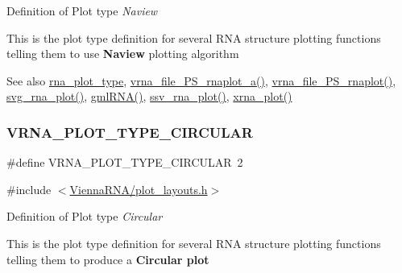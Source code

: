 Definition of Plot type {\itshape Naview} 

This is the plot type definition for several R\+NA structure plotting functions telling them to use {\bfseries Naview} plotting algorithm

\begin{DoxySeeAlso}{See also}
\hyperlink{group__plotting__utils_ga5964c4581431b098b80027d6e14dcdd4}{rna\+\_\+plot\+\_\+type}, \hyperlink{plot__structure_8h_a139a31dd0ba9fc6612431f67de901c31}{vrna\+\_\+file\+\_\+\+P\+S\+\_\+rnaplot\+\_\+a()}, \hyperlink{plot__structure_8h_abdc8f6548ba4a3bc3cd868ccbcfdb86a}{vrna\+\_\+file\+\_\+\+P\+S\+\_\+rnaplot()}, \hyperlink{plot__structure_8h_ae7853539b5df98f294b4af434e979304}{svg\+\_\+rna\+\_\+plot()}, \hyperlink{plot__structure_8h_a70834bc8c0aad4fe6824ff76ccb8f329}{gml\+R\+N\+A()}, \hyperlink{plot__structure_8h_add368528755f9a830727b680243541df}{ssv\+\_\+rna\+\_\+plot()}, \hyperlink{plot__structure_8h_a2f6d5953e6a323df898896b8d6614483}{xrna\+\_\+plot()} 
\end{DoxySeeAlso}
\mbox{\label{group__plotting__utils_ga8c9eac631348da92136c8363ecdd9fb9}} 
\subsubsection{\texorpdfstring{V\+R\+N\+A\+\_\+\+P\+L\+O\+T\+\_\+\+T\+Y\+P\+E\+\_\+\+C\+I\+R\+C\+U\+L\+AR}{VRNA\_PLOT\_TYPE\_CIRCULAR}}
{\footnotesize\ttfamily \#define V\+R\+N\+A\+\_\+\+P\+L\+O\+T\+\_\+\+T\+Y\+P\+E\+\_\+\+C\+I\+R\+C\+U\+L\+AR~2}



{\ttfamily \#include $<$\hyperlink{plot__layouts_8h}{Vienna\+R\+N\+A/plot\+\_\+layouts.\+h}$>$}



Definition of Plot type {\itshape Circular} 

This is the plot type definition for several R\+NA structure plotting functions telling them to produce a {\bfseries Circular plot}

